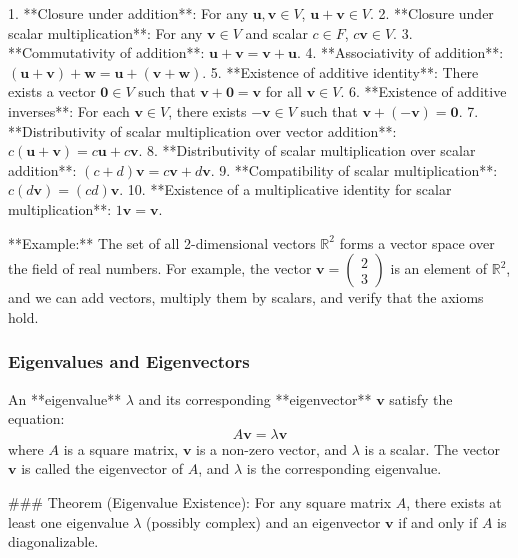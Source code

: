 \documentclass{article}
\begin{document}
1. **Closure under addition**: For any \( \mathbf{u}, \mathbf{v} \in V \), \( \mathbf{u} + \mathbf{v} \in V \).
2. **Closure under scalar multiplication**: For any \( \mathbf{v} \in V \) and scalar \( c \in F \), \( c \mathbf{v} \in V \).
3. **Commutativity of addition**: \( \mathbf{u} + \mathbf{v} = \mathbf{v} + \mathbf{u} \).
4. **Associativity of addition**: \( (\mathbf{u} + \mathbf{v}) + \mathbf{w} = \mathbf{u} + (\mathbf{v} + \mathbf{w}) \).
5. **Existence of additive identity**: There exists a vector \( \mathbf{0} \in V \) such that \( \mathbf{v} + \mathbf{0} = \mathbf{v} \) for all \( \mathbf{v} \in V \).
6. **Existence of additive inverses**: For each \( \mathbf{v} \in V \), there exists \( -\mathbf{v} \in V \) such that \( \mathbf{v} + (-\mathbf{v}) = \mathbf{0} \).
7. **Distributivity of scalar multiplication over vector addition**: \( c(\mathbf{u} + \mathbf{v}) = c\mathbf{u} + c\mathbf{v} \).
8. **Distributivity of scalar multiplication over scalar addition**: \( (c + d) \mathbf{v} = c\mathbf{v} + d\mathbf{v} \).
9. **Compatibility of scalar multiplication**: \( c(d\mathbf{v}) = (cd) \mathbf{v} \).
10. **Existence of a multiplicative identity for scalar multiplication**: \( 1 \mathbf{v} = \mathbf{v} \).

**Example:**
The set of all 2-dimensional vectors \( \mathbb{R}^2 \) forms a vector space over the field of real numbers. For example, the vector \( \mathbf{v} = \begin{pmatrix} 2 \\ 3 \end{pmatrix} \) is an element of \( \mathbb{R}^2 \), and we can add vectors, multiply them by scalars, and verify that the axioms hold.

\subsubsection*{Eigenvalues and Eigenvectors}

An **eigenvalue** \( \lambda \) and its corresponding **eigenvector** \( \mathbf{v} \) satisfy the equation:
\[
A \mathbf{v} = \lambda \mathbf{v}
\]
where \( A \) is a square matrix, \( \mathbf{v} \) is a non-zero vector, and \( \lambda \) is a scalar. The vector \( \mathbf{v} \) is called the eigenvector of \( A \), and \( \lambda \) is the corresponding eigenvalue.

### Theorem (Eigenvalue Existence):
For any square matrix \( A \), there exists at least one eigenvalue \( \lambda \) (possibly complex) and an eigenvector \( \mathbf{v} \) if and only if \( A \) is diagonalizable.
\end{document}

